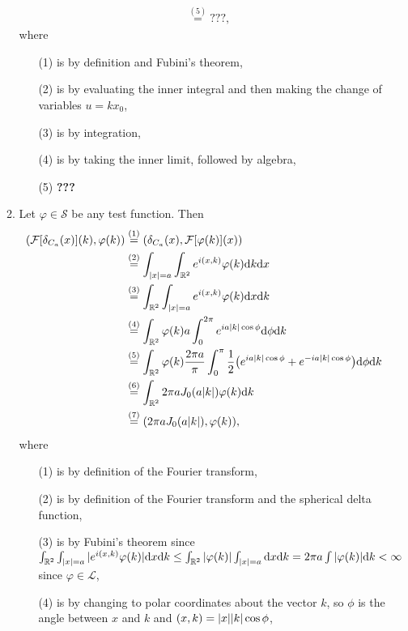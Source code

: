 \documentclass[11pt]{article}
\newcommand{\eq}[1]{\overset{(#1)}{=}}
\begin{document}
\begin{enumerate}
\begin{enumerate}[label=(\roman*)]
\begin{align*}
        &\eq{5} \textbf{???},
        \end{align*} where \begin{enumerate}
            \item[(1)] is by definition and Fubini's theorem,
            \item[(2)] is by evaluating the inner integral and then making the change of variables $u = kx_0$,
            \item[(3)] is by integration,
            \item[(4)] is by taking the inner limit, followed by algebra,
            \item[(5)] \textbf{???}
        \end{enumerate}
        \item Let $\varphi\in\mathcal S$ be any test function. Then \begin{align*}
            (\mathcal F[\delta_{C_a}(x)](k),\varphi(k)) &\eq{1} (\delta_{C_a}(x),\mathcal F[\varphi(k)](x)) \\
            &\eq{2} \int_{\abs{x} = a}\int_{\mathbb{R}^2}e^{i(x,k)}\varphi(k)\dd k \dd x\\
            &\eq{3} \int_{\mathbb{R}^2}\int_{\abs{x} = a}e^{i(x,k)}\varphi(k) \dd x \dd k\\
            &\eq{4} \int_{\mathbb R^2}\varphi(k)a\int_0^{2\pi} e^{ia \abs{k}\cos\phi}\dd \phi\dd k\\
            &\eq{5} \int_{\mathbb R^2}\varphi(k)\frac{2\pi a}{\pi}\int_0^{\pi} \frac{1}{2}\big(e^{ia \abs{k}\cos\phi}+e^{-ia \abs{k}\cos\phi}\big)\dd \phi\dd k\\
            &\eq{6} \int_{\mathbb R^2}2\pi a J_0(a\abs{k}) \varphi(k)\dd k\\
            &\eq{7} (2\pi a J_0(a\abs{k}),\varphi(k)),
        \end{align*} where \begin{enumerate}
            \item[(1)] is by definition of the Fourier transform,
            \item[(2)] is by definition of the Fourier transform and the spherical delta function,
            \item[(3)] is by Fubini's theorem since $\int_{\mathbb R^2}\int_{\abs{x} = a}|e^{i(x,k)}\varphi(k)|\dd x \dd k\leq \int_{\mathbb R^2}\abs{\varphi(k)}\int_{\abs{x} = a}\dd x \dd k = 2\pi a\int\abs{\varphi(k)}\dd k < \infty$ since $\varphi\in \mathcal L$,
            \item[(4)] is by changing to polar coordinates about the vector $k$, so $\phi$ is the angle between $x$ and $k$ and $(x,k) = \abs{x}\abs{k}\cos\phi$,

\end{enumerate}
\end{enumerate}
\end{enumerate}
\end{document}
